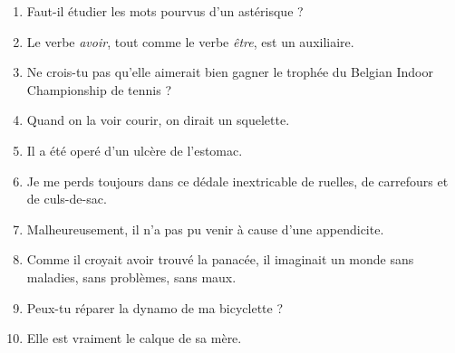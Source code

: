 \documentclass[11pt, french]{report}
\begin{document}
\begin{enumerate}
  \item Faut-il étudier les mots pourvus d'un astérisque ?
  \item Le verbe \textit{avoir}, tout comme le verbe \textit{être}, est un auxiliaire.
  \item Ne crois-tu pas qu'elle aimerait bien gagner le trophée du Belgian Indoor Championship de tennis ?
  \item Quand on la voir courir, on dirait un squelette.
  \item Il a été operé d'un ulcère de l'estomac.
  \item Je me perds toujours dans ce dédale inextricable de ruelles, de carrefours et de culs-de-sac.
  \item Malheureusement, il n'a pas pu venir à cause d'une appendicite.
  \item Comme il croyait avoir trouvé la panacée, il imaginait un monde sans maladies, sans problèmes, sans maux.
  \item Peux-tu réparer la dynamo de ma bicyclette ?
  \item Elle est vraiment le calque de sa mère.
\end{enumerate}
\end{document}
